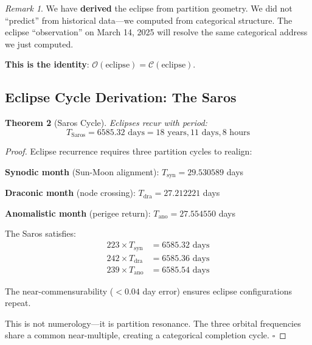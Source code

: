 \documentclass[twocolumn,10pt]{article}
\newtheorem{theorem}{Theorem}[section]
\theoremstyle{definition}
\theoremstyle{remark}
\newtheorem{remark}[theorem]{Remark}
\newcommand{\Obs}{\mathcal{O}}
\newcommand{\Comp}{\mathcal{C}}
\begin{document}
\begin{remark}
We have \textbf{derived} the eclipse from partition geometry. We did not ``predict'' from historical data---we computed from categorical structure. The eclipse ``observation'' on March 14, 2025 will resolve the same categorical address we just computed.

\textbf{This is the identity}: $\Obs(\text{eclipse}) = \Comp(\text{eclipse})$.
\end{remark}

\subsection{Eclipse Cycle Derivation: The Saros}

\begin{theorem}[Saros Cycle]
\label{thm:saros}
Eclipses recur with period:
\begin{equation}
T_{\text{Saros}} = 6585.32 \text{ days} = 18 \text{ years}, 11 \text{ days}, 8 \text{ hours}
\end{equation}
\end{theorem}

\begin{proof}
Eclipse recurrence requires three partition cycles to realign:

\textbf{Synodic month} (Sun-Moon alignment): $T_{\text{syn}} = 29.530589$ days

\textbf{Draconic month} (node crossing): $T_{\text{dra}} = 27.212221$ days

\textbf{Anomalistic month} (perigee return): $T_{\text{ano}} = 27.554550$ days

The Saros satisfies:
\begin{align}
223 \times T_{\text{syn}} &= 6585.32 \text{ days} \\
242 \times T_{\text{dra}} &= 6585.36 \text{ days} \\
239 \times T_{\text{ano}} &= 6585.54 \text{ days}
\end{align}

The near-commensurability ($<0.04$ day error) ensures eclipse configurations repeat.

This is not numerology---it is partition resonance. The three orbital frequencies share a common near-multiple, creating a categorical completion cycle. $\square$
\end{proof}
\end{document}
